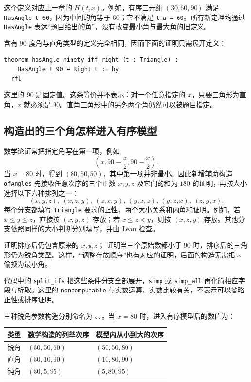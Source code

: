 \documentclass[UTF8,a4paper,zihao=-4,oneside,openany,fontset=fandol]{ctexbook}
\theoremstyle{definition}
\theoremstyle{remark}
\begin{document}
这个定义对应上一章的 $H(t,x)$。例如，有序三元组 $(30,60,90)$ 满足 \texttt{HasAngle t 60}，因为中间的角等于 $60$；它不满足 \texttt{t.a = 60}。所有新定理均通过 \texttt{HasAngle} 表达“题目给出的角”，没有改变最小角与最大角的旧定义。

含有 $90$ 度角与直角类型的定义完全相同，因而下面的证明只需展开定义：

\begin{Verbatim}
theorem hasAngle_ninety_iff_right (t : Triangle) :
    HasAngle t 90 ↔ Right t := by
  rfl
\end{Verbatim}

这里的 $90$ 是固定值。这条等价并不表示：对一个任意指定的 $x$，只要三角形为直角，$x$ 就必须是 $90$。直角三角形中的另外两个角仍然可以被题目指定。

\subsection{构造出的三个角怎样进入有序模型}

数学论证常把指定角写在第一项，例如
\[
\left(x,90-\frac x2,90-\frac x2\right).
\]
当 $x=80$ 时，得到 $(80,50,50)$，其中第一项并非最小。因此新增辅助构造 \texttt{ofAngles} 先接收任意次序的三个正数 $x,y,z$ 及它们的和为 $180$ 的证明，再按大小选择以下六种排列之一：
\[
(x,y,z),\ (x,z,y),\ (z,x,y),\ (y,x,z),\ (y,z,x),\ (z,y,x).
\]
每个分支都填写 \texttt{Triangle} 要求的正性、两个大小关系和内角和证明。例如，若 $x\le y\le z$，直接按 $(x,y,z)$ 存放；若 $x\le z<y$，则按 $(x,z,y)$ 存放。其他分支依照同样的大小判断分别填写，并由 Lean 检查。

 证明排序后仍包含原来的 $x,y,z$； 证明当三个原始数都小于 $90$ 时，排序后的三角形仍为锐角类型。这样，“调整存放顺序”也有对应的证明，后面的构造无需把 $x$ 偷换为最小角。

代码中的 \texttt{split\_ifs} 把这些条件分支全部展开，\texttt{simp} 或 \texttt{simp\_all} 再化简相应字段与析取。这里的 \texttt{noncomputable} 与实数运算、实数比较有关，不表示可以省略正性或排序证明。

三种锐角参数构造分别命名为 、、。当 $x=80$ 时，进入有序模型后的数值为：

\begin{center}
\begin{tabular}{lll}
\toprule
类型 & 数学构造的列举次序 & 模型内从小到大的次序\\
\midrule
锐角 & $(80,50,50)$ & $(50,50,80)$\\
直角 & $(80,10,90)$ & $(10,80,90)$\\
钝角 & $(80,5,95)$ & $(5,80,95)$\\
\bottomrule
\end{tabular}
\end{center}
\end{document}
